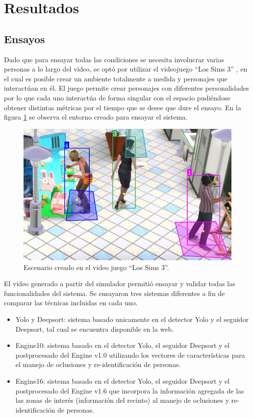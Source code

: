 \documentclass[conference]{IEEEtran}
\begin{document}
\section{Resultados}

\subsection{Ensayos}

Dado que para ensayar todas las condiciones se necesita involucrar varias personas a lo largo del video, se optó por utilizar el videojuego “Los Sims 3” \cite{b17}, en el cual es posible crear un ambiente totalmente a medida y personajes que interactúan en él. El juego permite crear personajes con diferentes personalidades por lo que cada uno interactúa de forma singular con el espacio pudiéndose obtener distintas métricas por el tiempo que se desee que dure el ensayo. En la figura \ref{fig:sims} se observa el entorno creado para ensayar el sistema.

\begin{figure}[htbp]
\centerline{\includegraphics[scale=.30]{./Figures/sims.jpg}}
\caption{Escenario creado en el video juego ``Los Sims 3''.}
\label{fig:sims}
\end{figure}

El video generado a partir del simulador permitió ensayar y validar todas las funcionalidades del sistema. Se ensayaron tres sistemas diferentes a fin de comparar las técnicas incluidas en cada uno.

\begin{itemize}
\item Yolo y Deepsort: sistema basado unicamente en el detector Yolo y el seguidor Deepsort, tal cual se encuentra disponible en la web.
\item Engine10: sistema basado en el detector Yolo, el seguidor Deepsort y el postprocesado del Engine v1.0 utilizando los vectores de características para el manejo de oclusiones y re-identificación de personas.
\item Engine16: sistema basado en el detector Yolo, el seguidor Deepsort y el postprocesado del Engine v1.6 que incorpora la información agregada de las las zonas de interés (información del recinto) al manejo de oclusiones y re-identificación de personas.
\end{itemize}
\end{document}
